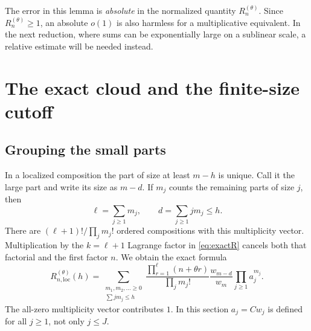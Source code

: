 \documentclass[11pt,a4paper]{article}
\theoremstyle{definition}
\theoremstyle{remark}
\numberwithin{equation}{section}
\begin{document}
The error in this lemma is \emph{absolute} in the normalized quantity
$R_n^{(\theta)}$. Since $R_n^{(\theta)}\ge1$, an absolute $o(1)$ is
also harmless for a multiplicative equivalent. In the next reduction,
where sums can be exponentially large on a sublinear scale, a relative
estimate will be needed instead.

\section{The exact cloud and the finite-size cutoff}\label{sec:cloud}

\subsection{Grouping the small parts}
In a localized composition the part of size at least $m-h$ is unique.
Call it the large part and write its size as $m-d$. If $m_j$ counts the
remaining parts of size $j$, then
\begin{equation}
 \ell=\sum_{j\ge1}m_j,\qquad d=\sum_{j\ge1}jm_j\le h.
 \label{eq:ellandd}
\end{equation}
There are $(\ell+1)!/\prod_jm_j!$ ordered compositions with this
multiplicity vector. Multiplication by the $k=\ell+1$ Lagrange factor
in \eqref{eq:exactR} cancels both that factorial and the first factor
$n$. We obtain the exact formula
\begin{equation}
 R_{n,\mathrm{loc}}^{(\theta)}(h)=
 \sum_{\substack{m_1,m_2,\ldots\ge0\\\sum jm_j\le h}}
 \frac{\prod_{r=1}^{\ell}(n+\theta r)}{\prod_jm_j!}
 \frac{w_{m-d}}{w_m}\prod_{j\ge1}a_j^{m_j}.
 \label{eq:cloudexact}
\end{equation}
The all-zero multiplicity vector contributes $1$. In this section
$a_j=Cw_j$ is defined for all $j\ge1$, not only $j\le J$.
\end{document}
